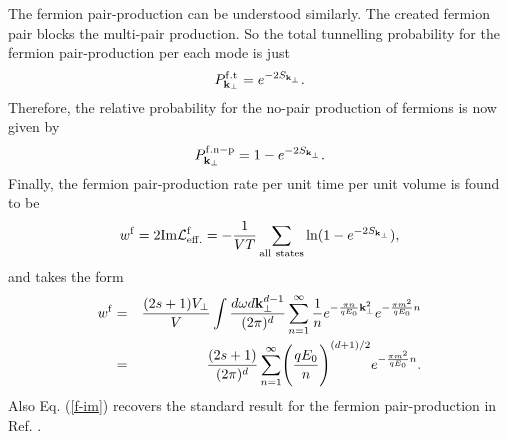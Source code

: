 \documentclass[a4paper,prd,showpacs,preprintnumbers,amsmath,amssymb]{revtex4}
\begin{document}
The fermion pair-production can be understood similarly. The
created fermion pair blocks the multi-pair production. So the
total tunnelling probability for the fermion pair-production per
each mode is just
\begin{equation}
P^{\rm f.t}_{{\bf k}_{\perp}} = e^{-2S_{{\bf k}_{\perp}}}.
\end{equation}
Therefore, the relative probability for the no-pair production of
fermions is now given by
\begin{equation}
P^{\rm f.n-p}_{{\bf k}_{\perp}} =1 -  e^{-2S_{{\bf k}_{\perp}}}.
\end{equation}
Finally, the fermion pair-production rate per unit time per unit
volume is found to be
\begin{equation}
w^{\rm f}  = 2 {\rm Im} {\cal L}^{\rm f}_{\rm eff.} = -
\frac{1}{VT} \sum_{\rm all~states} \ln (1 - e^{- 2S_{{\bf
k}_{\perp}}}), \label{f-p}
\end{equation}
and takes the form
\begin{eqnarray}
w^{\rm f} &=& \frac{(2s+1)V_{\perp}}{V}  \int \frac{d \omega d{\bf
k}_{\perp}^{d-1}}{(2\pi)^d} \sum_{n = 1}^{\infty} \frac{1}{n} e^{-
\frac{\pi n}{q E_0} {\bf k}_{\perp}^2} e^{- \frac{\pi m^2}{q E_0}
n} \nonumber\\ &=& \frac{(2s+1)}{(2\pi)^d} \sum_{n = 1}^{\infty}
\Biggl(\frac{q E_0}{n} \Biggr)^{(d+1)/2} e^{- \frac{\pi m^2}{q
E_0} n}. \label{f-im}
\end{eqnarray}
Also Eq. (\ref{f-im}) recovers the standard result for the fermion
pair-production in Ref. \cite{gus}.
\end{document}
